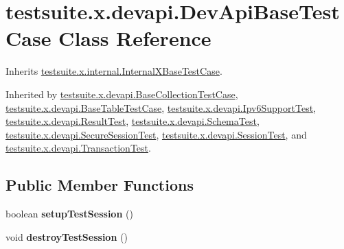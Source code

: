 \hypertarget{classtestsuite_1_1x_1_1devapi_1_1_dev_api_base_test_case}{}\section{testsuite.\+x.\+devapi.\+Dev\+Api\+Base\+Test\+Case Class Reference}
\label{classtestsuite_1_1x_1_1devapi_1_1_dev_api_base_test_case}


Inherits \mbox{\hyperlink{classtestsuite_1_1x_1_1internal_1_1_internal_x_base_test_case}{testsuite.\+x.\+internal.\+Internal\+X\+Base\+Test\+Case}}.



Inherited by \mbox{\hyperlink{classtestsuite_1_1x_1_1devapi_1_1_base_collection_test_case}{testsuite.\+x.\+devapi.\+Base\+Collection\+Test\+Case}}, \mbox{\hyperlink{classtestsuite_1_1x_1_1devapi_1_1_base_table_test_case}{testsuite.\+x.\+devapi.\+Base\+Table\+Test\+Case}}, \mbox{\hyperlink{classtestsuite_1_1x_1_1devapi_1_1_ipv6_support_test}{testsuite.\+x.\+devapi.\+Ipv6\+Support\+Test}}, \mbox{\hyperlink{classtestsuite_1_1x_1_1devapi_1_1_result_test}{testsuite.\+x.\+devapi.\+Result\+Test}}, \mbox{\hyperlink{classtestsuite_1_1x_1_1devapi_1_1_schema_test}{testsuite.\+x.\+devapi.\+Schema\+Test}}, \mbox{\hyperlink{classtestsuite_1_1x_1_1devapi_1_1_secure_session_test}{testsuite.\+x.\+devapi.\+Secure\+Session\+Test}}, \mbox{\hyperlink{classtestsuite_1_1x_1_1devapi_1_1_session_test}{testsuite.\+x.\+devapi.\+Session\+Test}}, and \mbox{\hyperlink{classtestsuite_1_1x_1_1devapi_1_1_transaction_test}{testsuite.\+x.\+devapi.\+Transaction\+Test}}.

\subsection*{Public Member Functions}
\begin{DoxyCompactItemize}
\item 
\mbox{\label{classtestsuite_1_1x_1_1devapi_1_1_dev_api_base_test_case_a086894e5ade506642e1af87a860c1e4f}} 
boolean {\bfseries setup\+Test\+Session} ()
\item 
\mbox{\label{classtestsuite_1_1x_1_1devapi_1_1_dev_api_base_test_case_af5b2fb8cdedd086eede03f2919c6be5c}} 
void {\bfseries destroy\+Test\+Session} ()
\end{DoxyCompactItemize}
